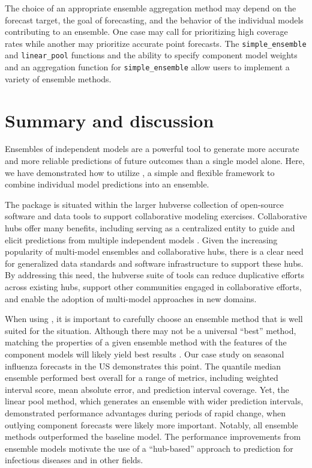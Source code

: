 \documentclass[
  article,
  shortnames,
  notitle]{jss}
\begin{document}
The choice of an appropriate ensemble aggregation method may depend on
the forecast target, the goal of forecasting, and the behavior of the
individual models contributing to an ensemble. One case may call for
prioritizing high coverage rates while another may prioritize accurate
point forecasts. The \texttt{simple\_ensemble} and \texttt{linear\_pool}
functions and the ability to specify component model weights and an
aggregation function for \texttt{simple\_ensemble} allow users to
implement a variety of ensemble methods.

\section{Summary and discussion}\label{sec-conclusions}

Ensembles of independent models are a powerful tool to generate more
accurate and more reliable predictions of future outcomes than a single
model alone. Here, we have demonstrated how to utilize
, a simple and flexible framework to combine
individual model predictions into an ensemble.

The  package is situated within the larger hubverse
collection of open-source software and data tools to support
collaborative modeling exercises. Collaborative hubs offer many
benefits, including serving as a centralized entity to guide and elicit
predictions from multiple independent models \citep{reich2022}. Given
the increasing popularity of multi-model ensembles and collaborative
hubs, there is a clear need for generalized data standards and software
infrastructure to support these hubs. By addressing this need, the
hubverse suite of tools can reduce duplicative efforts across existing
hubs, support other communities engaged in collaborative efforts, and
enable the adoption of multi-model approaches in new domains.

When using , it is important to carefully choose an
ensemble method that is well suited for the situation. Although there
may not be a universal ``best'' method, matching the properties of a
given ensemble method with the features of the component models will
likely yield best results \citep{howerton2023}. Our case study on
seasonal influenza forecasts in the US demonstrates this point. The
quantile median ensemble performed best overall for a range of metrics,
including weighted interval score, mean absolute error, and prediction
interval coverage. Yet, the linear pool method, which generates an
ensemble with wider prediction intervals, demonstrated performance
advantages during periods of rapid change, when outlying component
forecasts were likely more important. Notably, all ensemble methods
outperformed the baseline model. The performance improvements from
ensemble models motivate the use of a ``hub-based'' approach to
prediction for infectious diseases and in other fields.
\end{document}
